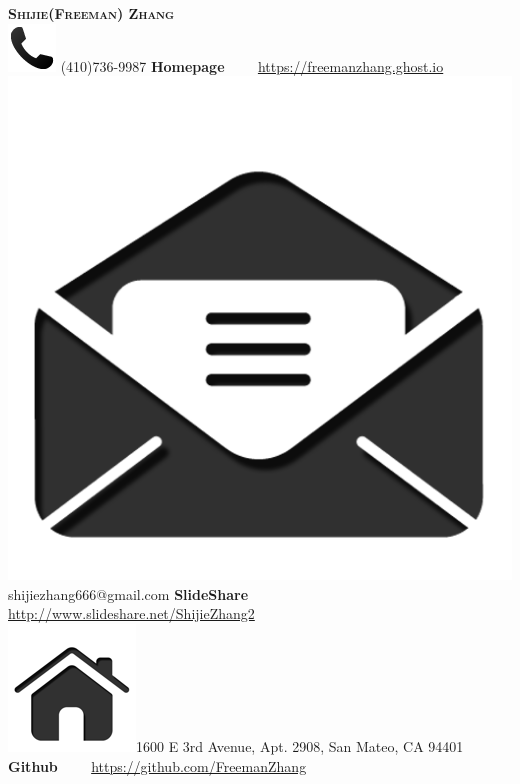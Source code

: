 \documentclass[3pt]{article}
\newenvironment{changemargin}[2]{%
  \begin{list}{}{%
    \setlength{\topsep}{0pt}%
    \setlength{\leftmargin}{#1}%
    \setlength{\rightmargin}{#2}%
    \setlength{\listparindent}{\parindent}%
    \setlength{\itemindent}{\parindent}%
    \setlength{\parsep}{\parskip}%
  }%
  \item[]}{\end{list}
}
\newcommand{\contact}[4]{
	\begin{changemargin}{-0.5in}{-0.5in}
		\begin{center}
			{\Large \scshape {#1}}\\ \smallskip
			{#2}\\ \smallskip
			{#3}\\ \smallskip
			{#4}\smallskip
		\end{center}
	\end{changemargin}
}
\begin{document}
\contact{\textbf{Shijie(Freeman) Zhang}}
{ \includegraphics[scale=0.18]{cellphone.png} \hspace{0pt} (410)736-9987 \hfill  \textbf{Homepage}\hspace{45pt} \href{http://freemanzhang.ghost.io}{$\begin{array}{l}\end{array} \hspace{15pt}$https://freemanzhang.ghost.io}}
{\includegraphics[scale=0.020]{email.png}  \hspace{0.35pt} shijiezhang666@gmail.com \hspace{30pt}   \hfill \textbf{SlideShare} \href{http://www.slideshare.net/ShijieZhang2}{$\begin{array}{l}\end{array} \hspace{15pt}$http://www.slideshare.net/ShijieZhang2}}
{ \includegraphics[scale=0.10]{home.png}\hspace{5pt}1600 E 3rd Avenue, Apt. 2908, San Mateo, CA 94401 \hspace{0pt}  \hfill \textbf{Github}\hspace{40pt} \href{https://github.com/FreemanZhang}{$\begin{array}{l}\end{array} \hspace{15pt}$https://github.com/FreemanZhang}}
\end{document}
